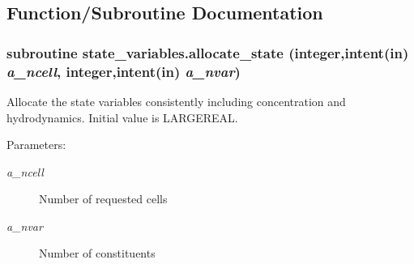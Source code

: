 \subsection{Function/Subroutine Documentation}
\hypertarget{a00037_02b466d6d8eb478ddb781a15f2d9c6d8}{
\subsubsection[{allocate\_\-state}]{\setlength{\rightskip}{0pt plus 5cm}subroutine state\_\-variables.allocate\_\-state (integer,intent(in) {\em a\_\-ncell}, \/  integer,intent(in) {\em a\_\-nvar})}}
\label{a00037_02b466d6d8eb478ddb781a15f2d9c6d8}


Allocate the state variables consistently including concentration and hydrodynamics. Initial value is LARGEREAL. 

\begin{Desc}
\item[Parameters:]
\begin{description}
\item[{\em a\_\-ncell}]Number of requested cells\item[{\em a\_\-nvar}]Number of constituents \end{description}
\end{Desc}
